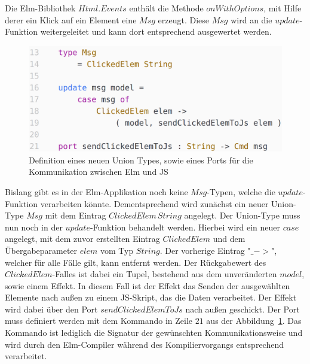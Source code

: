 Die Elm-Bibliothek $Html.Events$ enthält die Methode $onWithOptions$, mit Hilfe derer ein Klick auf ein Element eine $Msg$ erzeugt. Diese $Msg$ wird an die $update$-Funktion weitergeleitet und kann dort entsprechend ausgewertet werden.
\begin{figure}[htb]
\centering
\includegraphics[scale=0.3]{img/elm-port.png}
\caption{Definition eines neuen Union Types, sowie eines Ports für die Kommunikation zwischen Elm und \ac{JS}}\label{fig:create-port}
\end{figure}
Bislang gibt es in der Elm-Applikation noch keine $Msg$-Typen, welche die $update$-Funktion verarbeiten könnte. Dementsprechend wird zunächst ein neuer Union-Type $Msg$ mit dem Eintrag $ClickedElem\,String$ angelegt. Der Union-Type muss nun noch in der $update$-Funktion behandelt werden. Hierbei wird ein neuer $case$ angelegt, mit dem zuvor erstellten Eintrag $ClickedElem$ und dem Übergabeparameter $elem$ vom Typ $String$. Der vorherige Eintrag "$\_ ->$", welcher für alle Fälle gilt, kann entfernt werden. Der Rückgabewert des $ClickedElem$-Falles ist dabei ein Tupel, bestehend aus dem unveränderten $model$, sowie einem Effekt. In diesem Fall ist der Effekt das Senden der ausgewählten Elemente nach außen zu einem \ac{JS}-Skript, das die Daten verarbeitet. Der Effekt wird dabei über den Port $sendClickedElemToJs$ nach außen geschickt. Der Port muss definiert werden mit dem Kommando in Zeile $21$ aus der Abbildung~\ref{fig:create-port}. Das Kommando ist lediglich die Signatur der gewünschten Kommunikationsweise und wird durch den Elm-Compiler während des Kompiliervorgangs entsprechend verarbeitet.
